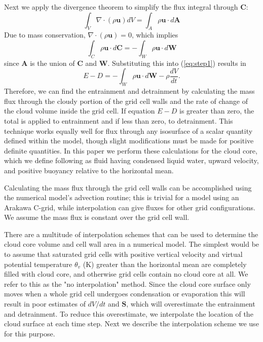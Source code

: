 \documentclass[12pt]{article}
\begin{document}
Next we apply the divergence theorem to simplify the flux integral through 
$\mathbf{C}$:
\begin{equation}
\label{eq:divergence} 
\int_{V} \nabla \cdot (\rho \mathbf{u}) dV = 
  \int_{A} \rho \mathbf{u}\cdot d\mathbf{A}
\end{equation}
Due to mass conservation, $\nabla \cdot (\rho \mathbf{u}) = 0$, which implies
\begin{equation}
\label{eq:divergence3} 
  \int_{C} \rho \mathbf{u}\cdot d\mathbf{C} = 
    - \int_{W} \rho \mathbf{u}\cdot d\mathbf{W}
\end{equation}
since $\mathbf{A}$ is the union of $\mathbf{C}$ and $\mathbf{W}$.  Substituting
this into (\ref{eq:step1}) results in
\begin{equation}
\label{eq:entrainment_detrainment} 
E - D = - \int_W \rho \mathbf{u} \cdot d\mathbf{W} - \rho \frac{dV}{dt}.
\end{equation}
Therefore, we can find the entrainment and detrainment by calculating the mass
flux through the cloudy portion of the grid cell walls and the rate of change
of the cloud volume inside the grid cell.  If equation $E - D$ is greater than 
zero, the total is applied to entrainment and if less than zero, to 
detrainment.  This technique works equally well for flux through any isosurface 
of a scalar quantity defined within the model, though slight modifications must
be made for positive definite quantities.  In this paper we perform these 
calculations for the cloud core, which we define following \cite{Siebesma1995} 
as fluid having condensed liquid water, upward velocity, and positive buoyancy 
relative to the horizontal mean.  

Calculating the mass flux through the grid cell walls can be accomplished using 
the numerical model's advection routine; this is trivial for a model using an 
Arakawa C-grid, while interpolation can give fluxes for other grid 
configurations.  We assume the mass flux is constant over the grid cell wall.  

There are a multitude of interpolation schemes that can be used to determine 
the cloud core volume and cell wall area in a numerical model.  The simplest 
would be to assume that saturated grid cells with positive vertical velocity 
and virtual potential temperature $\theta_v$ (K) greater than the horizontal 
mean are completely filled with cloud core, and otherwise grid cells contain 
no cloud core at all.  We refer to this as the "no interpolation" method.  
Since the cloud core surface only moves when a whole grid cell undergoes 
condensation or evaporation this will result in poor estimates of $dV/dt$ and
$\mathbf{S}$, which will overestimate the entrainment and detrainment.  To 
reduce this overestimate, we interpolate the location of the cloud surface at 
each time step.  Next we describe the interpolation scheme we use for this 
purpose.
\end{document}
